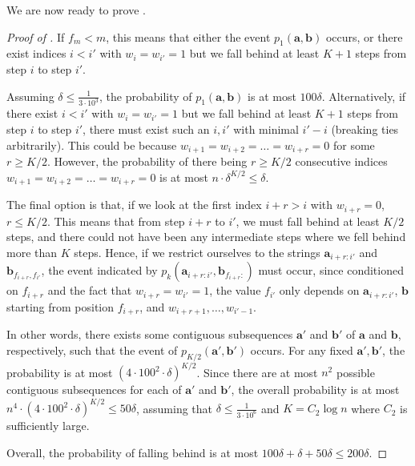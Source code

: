 \documentclass[12pt]{article}
\theoremstyle{definition}
\theoremstyle{remark}
\newcommand{\ba}{\mathbf a}
\newcommand{\bb}{\mathbf b}
\begin{document}
We are now ready to prove .

\begin{proof}[Proof of ]
    If $f_m < m$, this means that either the event $p_1(\ba, \bb)$ occurs, or there exist indices $i < i'$ with $w_i = w_{i'} = 1$ but we fall behind at least $K+1$ steps from step $i$ to step $i'$.

    Assuming $\delta \le \frac{1}{3 \cdot 10^3}$, the probability of $p_1(\ba, \bb)$ is at most $100 \delta$. Alternatively, if there exist $i < i'$ with $w_i = w_{i'} = 1$ but we fall behind at least $K+1$ steps from step $i$ to step $i'$, there must exist such an $i, i'$ with minimal $i'-i$ (breaking ties arbitrarily). This could be because $w_{i+1} = w_{i+2} = \dots = w_{i+r} = 0$ for some $r \ge K/2$. However, the probability of there being $r \ge K/2$ consecutive indices $w_{i+1} = w_{i+2} = \dots = w_{i+r} = 0$ is at most $n \cdot \delta^{K/2} \le \delta$. 
    
    The final option is that, if we look at the first index $i+r > i$ with $w_{i+r} = 0$, $r \le K/2$. This means that from step $i+r$ to $i'$, we must fall behind at least $K/2$ steps, and there could not have been any intermediate steps where we fell behind more than $K$ steps. Hence, if we restrict ourselves to the strings $\ba_{i+r:i'}$ and $\bb_{f_{i+r}, f_{i'}}$, the event indicated by $p_k(\ba_{i+r:i'}, \bb_{f_{i+r}:})$ must occur, since conditioned on $f_{i+r}$ and the fact that $w_{i+r}=w_{i'}=1$, the value $f_{i'}$ only depends on $\ba_{i+r:i'}$, $\bb$ starting from position $f_{i+r}$, and $w_{i+r+1}, \dots, w_{i'-1}$.

    In other words, there exists some contiguous subsequences $\ba'$ and $\bb'$ of $\ba$ and $\bb$, respectively, such that the event of $p_{K/2}(\ba', \bb')$ occurs. For any fixed $\ba', \bb'$, the probability is at most $(4 \cdot 100^2 \cdot \delta)^{K/2}$. Since there are at most $n^2$ possible contiguous subsequences for each of $\ba'$ and $\bb'$, the overall probability is at most $n^4 \cdot (4 \cdot 100^2 \cdot \delta)^{K/2} \le 50 \delta$, assuming that $\delta \le \frac{1}{3 \cdot 10^6}$ and $K = C_2 \log n$ where $C_2$ is sufficiently large.

    Overall, the probability of falling behind is at most $100 \delta + \delta + 50 \delta \le 200 \delta$.
\end{proof}
\end{document}
